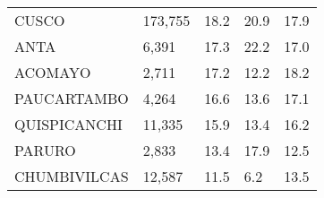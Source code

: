 \begin{tabular}{lllll}
	\cellcolor[HTML]{FF5050}CUSCO                                  & 173,755                                                               & 18.2                                                                             & 20.9                                                                        & 17.9                                                                                \\
	\cellcolor[HTML]{FF5050}ANTA                                   & 6,391                                                                 & 17.3                                                                             & 22.2                                                                        & 17.0                                                                                \\
	\cellcolor[HTML]{FF5050}ACOMAYO                                & 2,711                                                                 & 17.2                                                                             & 12.2                                                                        & 18.2                                                                                \\
	\cellcolor[HTML]{FF5050}PAUCARTAMBO                            & 4,264                                                                 & 16.6                                                                             & 13.6                                                                        & 17.1                                                                                \\
	\cellcolor[HTML]{FF5050}QUISPICANCHI                           & 11,335                                                                & 15.9                                                                             & 13.4                                                                        & 16.2                                                                                \\
	\cellcolor[HTML]{FF5050}PARURO                                 & 2,833                                                                 & 13.4                                                                             & 17.9                                                                        & 12.5                                                                                \\
	\cellcolor[HTML]{FF5050}CHUMBIVILCAS                           & 12,587                                                                & 11.5                                                                             & 6.2                                                                         & 13.5                                                                                \\

\end{tabular}
